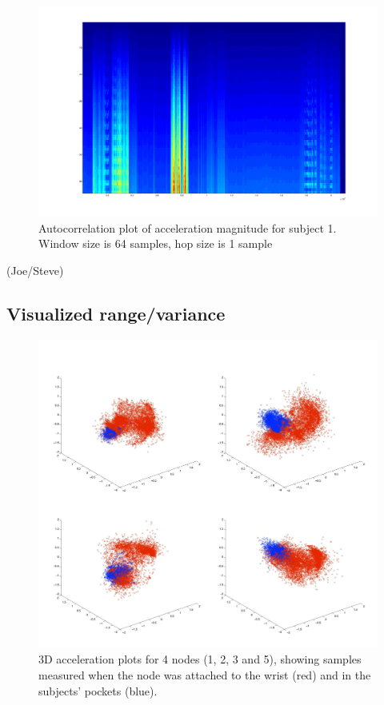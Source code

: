 \documentclass{article}
\begin{document}
\begin{figure}
\centerline{\includegraphics[width=\textwidth]{images/node1_autocorrelation_w64.pdf}}
\caption{Autocorrelation plot of acceleration magnitude for subject 1. Window size is 64 samples, hop size is 1 sample}
\label{fig:predresults}
\end{figure}

(Joe/Steve)

\subsection{Visualized range/variance}

\begin{figure}
\centerline{\includegraphics[width=\textwidth]{images/accel_smoothed5_nodes1235.jpg}}
\caption{3D acceleration plots for 4 nodes (1, 2, 3 and 5), showing samples measured when the node was attached to the wrist (red) and in the subjects' pockets (blue).}
\label{fig:predresults}
\end{figure}
\end{document}
